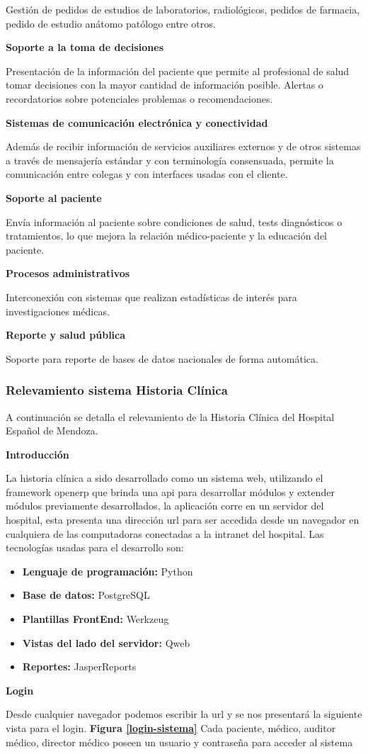 Gestión de pedidos de estudios de laboratorios, radiológicos, pedidos de farmacia, pedido de estudio anátomo patólogo entre otros. 

\textbf{Soporte a la toma de decisiones}

Presentación de la información del paciente que permite al profesional de salud tomar decisiones con la mayor cantidad de información posible. Alertas o recordatorios sobre potenciales problemas o recomendaciones.

\textbf{Sistemas de comunicación electrónica y conectividad}

Además de recibir información de servicios auxiliares externos y de otros sistemas a través de mensajería estándar y con terminología consensuada, permite la comunicación entre colegas y con interfaces usadas con el cliente.

\textbf{Soporte al paciente}

Envía información al paciente sobre condiciones de salud, tests diagnósticos o tratamientos, lo que mejora la relación médico-paciente y la educación del paciente.

\textbf{Procesos administrativos}

Interconexión con sistemas que realizan estadísticas de interés para investigaciones médicas.

\textbf{Reporte y salud pública}

Soporte para reporte de bases de datos nacionales de forma automática.

\subsubsection{Relevamiento sistema Historia Clínica}
A continuación se detalla el relevamiento de la Historia Clínica del Hospital Español de Mendoza.

{\correccionTexto
\textbf{Introducción}

La historia clínica a sido desarrollado como un sistema web,  utilizando el framework openerp que brinda una api para desarrollar módulos y extender módulos previamente desarrollados, la aplicación corre en un servidor del hospital, esta presenta una dirección url para ser accedida desde un navegador en cualquiera de las computadoras conectadas a la intranet del hospital. Las tecnologías usadas para el desarrollo son:

\begin{itemize}
	\item\textbf{Lenguaje de programación:} Python
    \item\textbf{Base de datos:} PostgreSQL
    \item\textbf{Plantillas FrontEnd:} Werkzeug
    \item\textbf{Vistas del lado del servidor:} Qweb
    \item\textbf{Reportes:} JasperReports
\end{itemize}

\textbf{Login}

Desde cualquier navegador podemos escribir la url y se nos presentará la siguiente vista para el login. \textbf{Figura \ref{login-sistema}}
Cada paciente, médico, auditor médico, director médico poseen un usuario y contraseña para acceder al sistema
}

